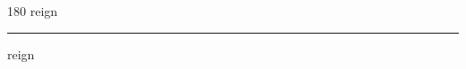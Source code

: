 
\begin{frame}
\begin{center}
\begin{turn}{180}
{\fontsize{2.5cm}{1em}\selectfont reign}
\end{turn}
\vspace{1em}\par  
\hrule
\vspace{1em}\par  
{\fontsize{2.5cm}{1em}\selectfont reign}
\end{center}
\end{frame}
